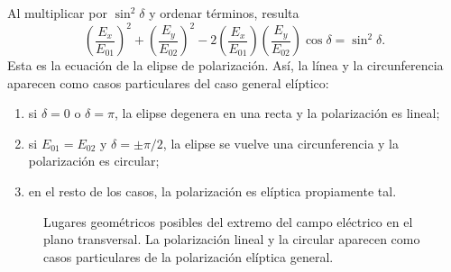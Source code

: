 \documentclass[../main.tex]{subfiles}
\begin{document}
Al multiplicar por $\sin^2\delta$ y ordenar términos, resulta
\begin{equation*}
    \left(\frac{E_x}{E_{01}}\right)^2+
    \left(\frac{E_y}{E_{02}}\right)^2-
    2\left(\frac{E_x}{E_{01}}\right)\left(\frac{E_y}{E_{02}}\right)\cos\delta
    =\sin^2\delta.
\end{equation*}
Esta es la ecuación de la elipse de polarización. Así, la línea y la circunferencia aparecen como casos particulares del caso general elíptico:
\begin{enumerate}[label=\arabic*.]
    \item si $\delta=0$ o $\delta=\pi$, la elipse degenera en una recta y la polarización es lineal;
    \item si $E_{01}=E_{02}$ y $\delta=\pm\pi/2$, la elipse se vuelve una circunferencia y la polarización es circular;
    \item en el resto de los casos, la polarización es elíptica propiamente tal.
\end{enumerate}

\begin{figure}[ht]
    \centering
    \begingroup
    \shorthandoff{<>}
    \endgroup
    \caption{Lugares geométricos posibles del extremo del campo eléctrico en el plano transversal. La polarización lineal y la circular aparecen como casos particulares de la polarización elíptica general.}
\end{figure}
\end{document}
